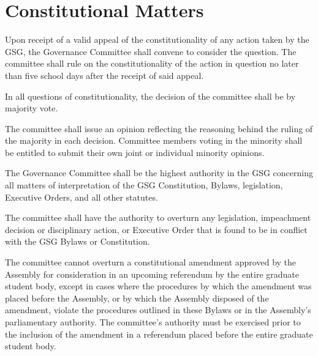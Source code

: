 \section{Constitutional Matters}
\begin{bylaws-number}
  \item Upon receipt of a valid appeal of the constitutionality of any action taken by the GSG, the Governance Committee shall convene to consider the question. The committee shall rule on the constitutionality of the action in question no later than five school days after the receipt of said appeal.
  \item In all questions of constitutionality, the decision of the committee shall be by majority vote.
  \item The committee shall issue an opinion reflecting the reasoning behind the ruling of the majority in each decision. Committee members voting in the minority shall be entitled to submit their own joint or individual minority opinions.
  \item The Governance Committee shall be the highest authority in the GSG concerning all matters of interpretation of the GSG Constitution, Bylaws, legislation, Executive Orders, and all other statutes.
  \item The committee shall have the authority to overturn any legislation, impeachment decision or disciplinary action, or Executive Order that is found to be in conflict with the GSG Bylaws or Constitution.
  \item The committee cannot overturn a constitutional amendment approved by the Assembly for consideration in an upcoming referendum by the entire graduate student body, except in cases where the procedures by which the amendment was placed before the Assembly, or by which the Assembly disposed of the amendment, violate the procedures outlined in these Bylaws or in the Assembly’s parliamentary authority. The committee’s authority must be exercised prior to the inclusion of the amendment in a referendum placed before the entire graduate student body.
\end{bylaws-number}

